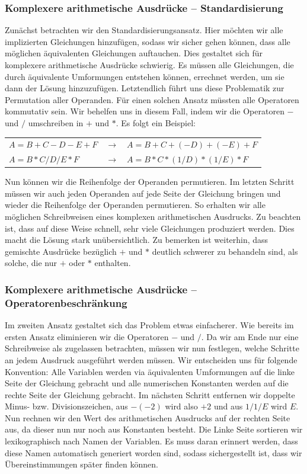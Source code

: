 \subsubsection{Komplexere arithmetische Ausdrücke -- Standardisierung}

Zunächst betrachten wir den Standardisierungsansatz. Hier möchten wir alle implizierten Gleichungen hinzufügen, sodass wir sicher gehen können, dass alle möglichen äquivalenten Gleichungen auftauchen. Dies gestaltet sich für komplexere arithmetische Ausdrücke schwierig. Es müssen alle Gleichungen, die durch äquivalente Umformungen entstehen können, errechnet werden, um sie dann der Lösung hinzuzufügen. Letztendlich führt uns diese Problematik zur Permutation aller Operanden. Für einen solchen Ansatz müssten alle Operatoren kommutativ sein. Wir behelfen uns in diesem Fall, indem wir die Operatoren $-$ und $/$ umschreiben in $+$ und $*$. Es folgt ein Beispiel:

\begin{tabular}{lll}
$A=B+C-D-E+F$ & $\to$ & $A=B+C+(-D)+(-E)+F$\\
$A=B*C/D/E*F$ & $\to$ & $A=B*C*(1/D)*(1/E)*F$\\
\end{tabular}

Nun können wir die Reihenfolge der Operanden permutieren. Im letzten Schritt müssen wir auch jeden Operanden auf jede Seite der Gleichung bringen und wieder die Reihenfolge der Operanden permutieren. So erhalten wir alle möglichen Schreibweisen eines komplexen arithmetischen Ausdrucks. Zu beachten ist, dass auf diese Weise schnell, sehr viele Gleichungen produziert werden. Dies macht die Lösung stark unübersichtlich. Zu bemerken ist weiterhin, dass gemischte Ausdrücke bezüglich $+$ und $*$ deutlich schwerer zu behandeln sind, als solche, die nur $+$ oder $*$ enthalten.

\subsubsection{Komplexere arithmetische Ausdrücke -- Operatorenbeschränkung}

Im zweiten Ansatz gestaltet sich das Problem etwas einfacherer. Wie bereits im ersten Ansatz eliminieren wir die Operatoren $-$ und $/$. Da wir am Ende nur eine Schreibweise als zugelassen betrachten, müssen wir nun festlegen, welche Schritte an jedem Ausdruck ausgeführt werden müssen. Wir entscheiden uns für folgende Konvention: Alle Variablen werden via äquivalenten Umformungen auf die linke Seite der Gleichung gebracht und alle numerischen Konstanten werden auf die rechte Seite der Gleichung gebracht. Im nächsten Schritt entfernen wir doppelte Minus- bzw. Divisionszeichen, aus $-(-2)$ wird also $+2$ und aus $1/1/E$ wird $E$. Nun rechnen wir den Wert des arithmetischen Ausdrucks auf der rechten Seite aus, da dieser nun nur noch aus Konstanten besteht. Die Linke Seite sortieren wir lexikographisch nach Namen der Variablen. Es muss daran erinnert werden, dass diese Namen automatisch generiert worden sind, sodass sichergestellt ist, dass wir Übereinstimmungen später finden können.

